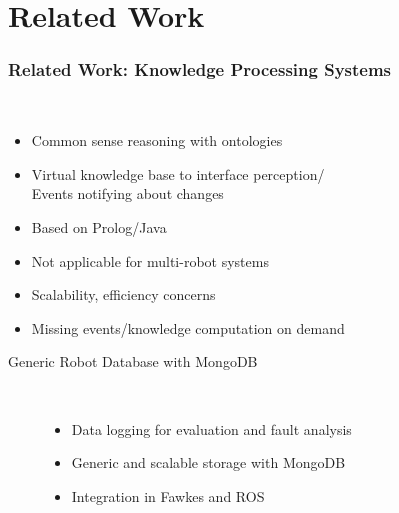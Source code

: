 \section{Related Work}
\begin{frame}
  \frametitle{Related Work: Knowledge Processing Systems}
  \begin{description}[]
  \item[KnowRob/OpenRobots Ontology (ORO)] \hfill \\
    \begin{itemize}
    \item Common sense reasoning with ontologies
    \item Virtual knowledge base to interface perception/\\
          Events notifying about changes
    \item Based on Prolog/Java
    \end{itemize}
  \end{description}
  \begin{block}{}
  \begin{itemize}
  \item Not applicable for multi-robot systems
  \item Scalability, efficiency concerns
  \item Missing events/knowledge computation on demand
  \end{itemize}
  \end{block}
  \begin{description}
  \item[Generic Robot Database with MongoDB] \hfill \\
    \begin{itemize}
    \item Data logging for evaluation and fault analysis
    \item Generic and scalable storage with MongoDB
    \item Integration in Fawkes and ROS
    \end{itemize}
  \end{description}
\end{frame}


